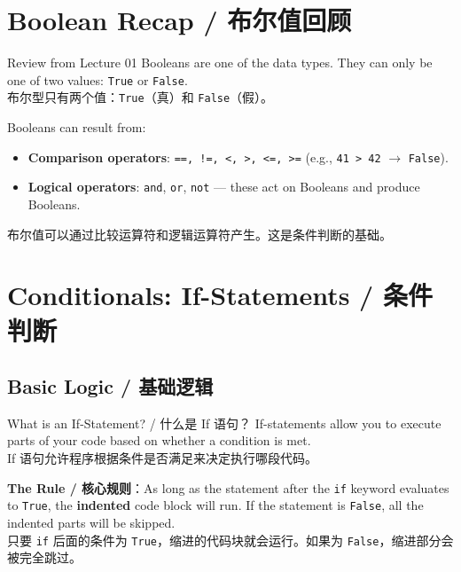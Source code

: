 \documentclass[11pt,a4paper]{report}
\let\oldtexttt\texttt
\renewcommand{\texttt}[1]{\textcolor{mainblue}{\oldtexttt{#1}}}
\begin{document}
\section{Boolean Recap / 布尔值回顾}

\begin{concept}{Review from Lecture 01}
    Booleans are one of the data types. They can only be one of two values: \texttt{True} or \texttt{False}. \\
    布尔型只有两个值：\texttt{True}（真）和 \texttt{False}（假）。

    Booleans can result from:
    \begin{itemize}[itemsep=0.3em]
        \item \textbf{Comparison operators}: \texttt{==, !=, <, >, <=, >=} (e.g., \texttt{41 > 42} $\rightarrow$ \texttt{False}).
        \item \textbf{Logical operators}: \texttt{and}, \texttt{or}, \texttt{not} — these act on Booleans and produce Booleans.
    \end{itemize}
    布尔值可以通过比较运算符和逻辑运算符产生。这是条件判断的基础。
\end{concept}

\section{Conditionals: If-Statements / 条件判断}

\subsection{Basic Logic / 基础逻辑}

\begin{concept}{What is an If-Statement? / 什么是 If 语句？}
    If-statements allow you to execute parts of your code based on whether a condition is met. \\
    If 语句允许程序根据条件是否满足来决定执行哪段代码。

    \textbf{The Rule / 核心规则}：As long as the statement after the \texttt{if} keyword evaluates to \texttt{True}, the \textbf{indented} code block will run. If the statement is \texttt{False}, all the indented parts will be skipped. \\
    只要 \texttt{if} 后面的条件为 \texttt{True}，缩进的代码块就会运行。如果为 \texttt{False}，缩进部分会被完全跳过。
\end{concept}
\end{document}
